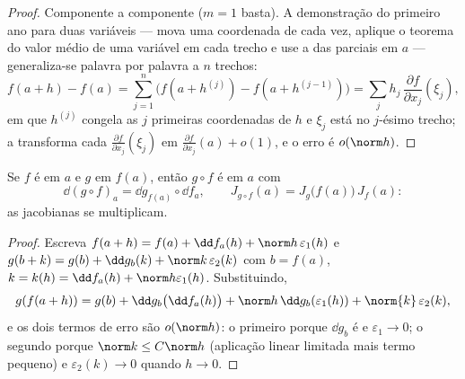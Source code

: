 \begin{proof}
Componente a componente ($m = 1$ basta). A demonstração do primeiro ano para duas
variáveis --- mova uma coordenada de cada vez, aplique o teorema do valor
médio de uma variável em cada trecho e use a  das parciais
em $a$ --- generaliza-se palavra por palavra a $n$ trechos:
\[
f(a + h) - f(a) = \sum_{j=1}^{n} \bigl(f(a + h^{(j)}) - f(a +
h^{(j-1)})\bigr)
= \sum_j h_j\,\frac{\partial f}{\partial x_j}(\xi_j),
\]
em que $h^{(j)}$ congela as $j$ primeiras coordenadas de $h$ e
$\xi_j$ está no $j$-ésimo trecho; a  transforma cada
$\frac{\partial f}{\partial x_j}(\xi_j)$ em $\frac{\partial
f}{\partial x_j}(a) + o(1)$, e o erro é $o(\norm h)$.
\end{proof}

\begin{theorem}\label{thm:b2:diffcalc:chainrule}
Se $f$ é  em $a$ e $g$ em $f(a)$, então $g \circ f$
é  em $a$ com
\[
\dd(g \circ f)_a = \dd g_{f(a)} \circ \dd f_a ,
\qquad
J_{g\circ f}(a) = J_g\bigl(f(a)\bigr)\,J_f(a) :
\]
as jacobianas se multiplicam.
\end{theorem}

\begin{proof}
Escreva $f(a + h) = f(a) + \dd f_a(h) + \norm h\,\varepsilon_1(h)$
e $g(b + k) = g(b) + \dd g_b(k) + \norm k\,\varepsilon_2(k)$ com
$b = f(a)$, $k = k(h) = \dd f_a(h) + \norm h \varepsilon_1(h)$.
Substituindo,
\[
g(f(a+h)) = g(b) + \dd g_b\bigl(\dd f_a(h)\bigr)
+ \norm h\,\dd g_b(\varepsilon_1(h)) + \norm{k}\,\varepsilon_2(k),
\]
e os dois termos de erro são $o(\norm h)$: o primeiro porque $\dd g_b$ é
 e $\varepsilon_1 \to 0$; o segundo porque $\norm k
\leq C\norm h$ (aplicação linear limitada mais termo pequeno) e
$\varepsilon_2(k) \to 0$ quando $h \to 0$.
\end{proof}

